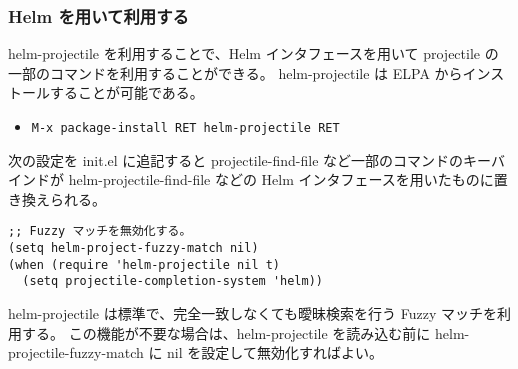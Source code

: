 \subsubsection{Helm を用いて利用する}
helm-projectile を利用することで、Helm インタフェースを用いて projectile の一部のコマンドを利用することができる。
helm-projectile は ELPA からインストールすることが可能である。
\begin{itemize}\setlength{\leftskip}{-1.00zw}%
\item[] \texttt{M-x package-install RET helm-projectile RET}
\end{itemize}
次の設定を init.el に追記すると projectile-find-file など一部のコマンドのキーバインドが helm-projectile-find-file などの Helm インタフェースを用いたものに置き換えられる。
\begin{mdframed}[roundcorner=0.50zw,leftmargin=3.00zw,rightmargin=3.00zw,skipabove=0.40zw,skipbelow=0.40zw,innertopmargin=4.00pt,innerbottommargin=4.00pt,innerleftmargin=5.00pt,innerrightmargin=5.00pt,linecolor=gray!020,linewidth=0.50pt,backgroundcolor=gray!20]
\begin{verbatim}
;; Fuzzy マッチを無効化する。
(setq helm-project-fuzzy-match nil)
(when (require 'helm-projectile nil t)
  (setq projectile-completion-system 'helm))
\end{verbatim}
\end{mdframed}
helm-projectile は標準で、完全一致しなくても曖昧検索を行う Fuzzy マッチを利用する。
この機能が不要な場合は、helm-projectile を読み込む前に helm-projectile-fuzzy-match に nil を設定して無効化すればよい。
